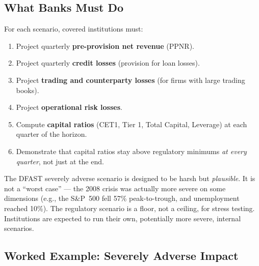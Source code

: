 \documentclass[11pt, a4paper]{article}
\theoremstyle{definition}
\theoremstyle{plain}
\theoremstyle{remark}
\begin{document}
\subsection{What Banks Must Do}

For each scenario, covered institutions must:
\begin{enumerate}
    \item Project quarterly \textbf{pre-provision net revenue} (PPNR).
    \item Project quarterly \textbf{credit losses} (provision for loan losses).
    \item Project \textbf{trading and counterparty losses} (for firms with large trading books).
    \item Project \textbf{operational risk losses}.
    \item Compute \textbf{capital ratios} (CET1, Tier 1, Total Capital, Leverage)
          at each quarter of the horizon.
    \item Demonstrate that capital ratios stay above regulatory minimums
          \emph{at every quarter}, not just at the end.
\end{enumerate}

\begin{warningbox}
The DFAST severely adverse scenario is designed to be harsh but \emph{plausible}.
It is not a ``worst case'' --- the 2008 crisis was actually more severe on some dimensions
(e.g., the S\&P~500 fell 57\% peak-to-trough, and unemployment reached 10\%).
The regulatory scenario is a floor, not a ceiling, for stress testing.
Institutions are expected to run their own, potentially more severe, internal scenarios.
\end{warningbox}

\subsection{Worked Example: Severely Adverse Impact}
\end{document}

